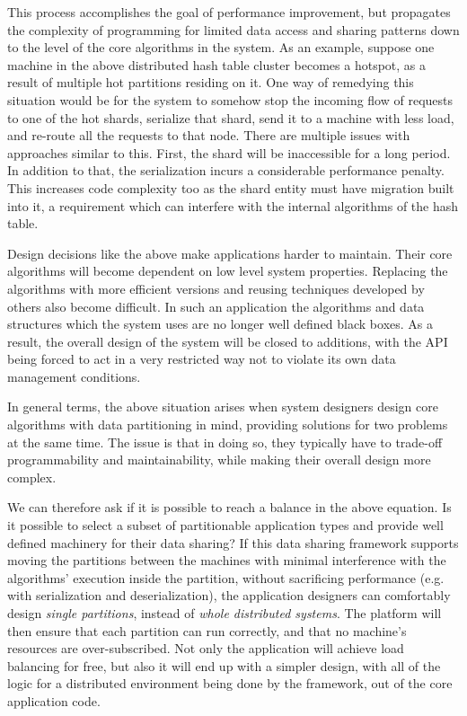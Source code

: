 This process accomplishes the goal of performance improvement, but propagates
the complexity of programming for limited data access and sharing patterns
down to the level of the core algorithms in the system. As an example, suppose
one machine in the above distributed hash table cluster becomes a hotspot,
as a result of multiple hot partitions residing on it. One way of
remedying this situation would be for the system to somehow stop the incoming
flow of requests to one of the hot shards, serialize that shard, send it to
a machine with less load, and re-route all the requests to that node. There
are multiple issues with approaches similar to this. First, the shard will be
inaccessible for a long period. In addition to that,
the serialization incurs a considerable performance penalty. This increases
code complexity too as the shard entity must have migration built into it,
a requirement which can interfere with the internal algorithms of the hash
table.

Design decisions like the above make applications harder to maintain. Their
core algorithms will become dependent on low level system properties.
Replacing the
algorithms with more efficient versions and reusing techniques developed by
others also become difficult. In such an application
the algorithms and data structures which the system uses are no longer well
defined black boxes. As a result, the overall design of the system will be
closed to additions, with the API being forced to act in a very restricted way
not to violate its own data management conditions.

In general terms, the above situation arises when system designers design
core algorithms with data partitioning in mind, providing solutions for two
problems at the same time. The issue is that in doing so, they typically have to
trade-off programmability and maintainability, while making their overall design
more complex.

We can therefore ask if it is possible to reach a balance in the above equation.
Is it possible to select a subset of partitionable application types
and provide well defined machinery for their data sharing? If this data sharing
framework supports moving the partitions between the machines with minimal
interference with the algorithms' execution inside the partition, without
sacrificing performance (e.g. with serialization and deserialization), the
application designers can comfortably design \emph{single partitions}, instead
of \emph{whole distributed systems}. The platform will then ensure that each
partition can run correctly, and that no machine's resources are
over-subscribed. Not only the application will achieve load balancing for free,
but also it will end up with a simpler design, with all
of the logic for a distributed environment being done by the framework,
out of the core application code.

